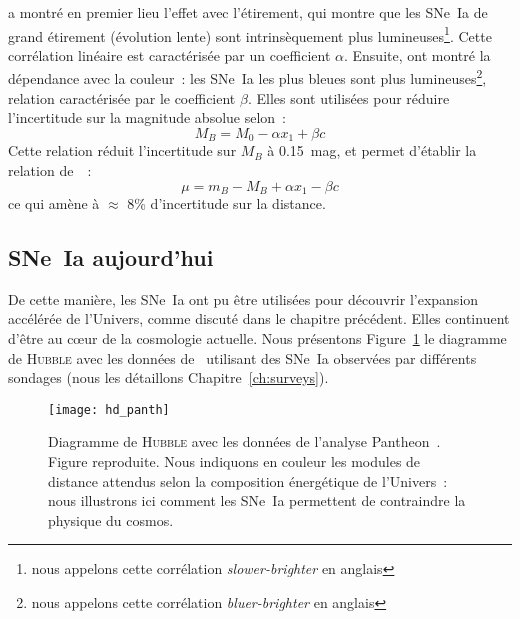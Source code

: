 \documentclass[../main/main.tex]{subfiles}
\begin{document}
\cite{phillips1993} a montré en premier lieu l'effet avec l'étirement, qui
montre que les SNe~Ia de grand étirement (évolution lente) sont intrinsèquement
plus lumineuses\footnote{nous appelons cette corrélation
\textit{slower-brighter} en anglais}. Cette corrélation linéaire est
caractérisée par un coefficient $\alpha$. Ensuite, \cite{hamuy1996} ont montré
la dépendance avec la couleur~: les SNe~Ia les plus bleues sont plus
lumineuses\footnote{nous appelons cette corrélation \textit{bluer-brighter} en
anglais}, relation caractérisée par le coefficient $\beta$. Elles sont utilisées
pour réduire l'incertitude sur la magnitude absolue selon~:
\begin{equation}\label{eq:mxc}
    M_B = M_0 - \alpha x_1 + \beta c
\end{equation}
Cette relation réduit l'incertitude sur $M_B$ à \SI{0.15}{mag}, et permet
d'établir la relation de~\cite{tripp1998}~:
\begin{equation}
    \mu = m_B - M_B + \alpha x_1 - \beta c
\end{equation}
ce qui amène à $\approx$ 8\% d'incertitude sur la distance.

\subsection{SNe~Ia aujourd'hui}\label{ssec:snetoday}

De cette manière, les SNe~Ia ont pu être utilisées pour découvrir l'expansion
accélérée de l'Univers, comme discuté dans le chapitre précédent. Elles
continuent d'être au cœur de la cosmologie actuelle. Nous présentons
Figure~\ref{fig:hubdiag} le diagramme de \textsc{Hubble} avec les données
de~\cite{scolnic2018} utilisant des SNe~Ia observées par différents sondages
(nous les détaillons Chapitre~\ref{ch:surveys}).

\begin{figure}[]
    \centering
    \texttt{[image: hd\_panth]}
    \caption[Diagramme de \textsc{Hubble} avec les données de l'analyse
    Pantheon]{Diagramme de \textsc{Hubble} avec les données de l'analyse
        Pantheon~\citep{scolnic2018}. Figure reproduite. Nous indiquons en
        couleur les modules de distance attendus selon la composition
        énergétique de l'Univers~: nous illustrons ici comment les SNe~Ia
    permettent de contraindre la physique du cosmos.}\label{fig:hubdiag}
\end{figure}
\end{document}
